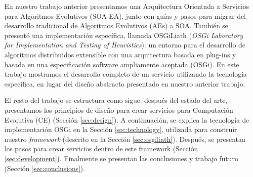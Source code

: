 \documentclass[runningheads]{llncs}
\begin{document}

En nuestro trabajo anterior \cite{OSGILIATH} presentamos una
Arquitectura Orientada a Servicios para Algoritmos Evolutivos
(SOA-EA), junto con guías y pasos para migrar del desarrollo
tradicional de Algoritmos Evolutivos (AEs) a SOA. También se presentó
una implementación específica, llamada OSGiLiath ({\em OSGi Laboratory
  for Implementation and Testing of Heuristics}): 
  un entorno para el
desarrollo de algoritmos distribuidos extensible con una arquitectura
basada en plug-ins y basada en una especificación software ampliamente
aceptada (OSGi). En este trabajo mostramos el desarrollo completo de
un servicio utilizando la tecnología específica, en lugar del diseño
abstracto presentado en nuestro anterior trabajo. %

El resto del trabajo se estructura como sigue: después del estado del
arte, presentamos los principios de diseño para crear servicios para
Computación Evolutiva (CE) (Sección \ref{sec:design}). A continuación,
se explica la tecnología de implementación OSGi en la Sección
\ref{sec:technology}, utilizada para construir nuestro {\em framework}
(descrito en la Sección \ref{sec:osgiliath}). Después, se presentan
los pasos para crear servicios dentro de este framework (Sección
\ref{sec:development}). Finalmente se presentan las conclusiones y
trabajo futuro (Sección \ref{sec:conclusions}). %
\end{document}
